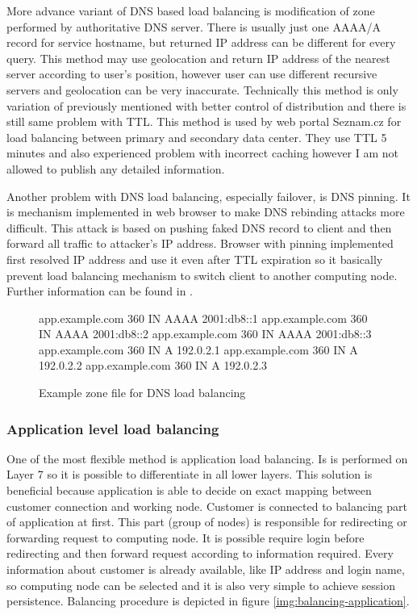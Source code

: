 More advance variant of \Ac{DNS} based load balancing is modification of zone performed by authoritative \Ac{DNS} server. There is usually just one AAAA/A record for service hostname, but returned \Ac{IP} address can be different for every query. This method may use geolocation and return \Ac{IP} address of the nearest server according to user's position, however user can use different recursive servers and geolocation can be very inaccurate. Technically this method is only variation of previously mentioned with better control of distribution and there is still same problem with \Ac{TTL}. This method is used by web portal Seznam.cz for load balancing between primary and secondary data center. They use \Ac{TTL} 5 minutes and also experienced problem with incorrect caching however I am not allowed to publish any detailed information.

Another problem with DNS load balancing, especially failover, is \Ac{DNS} pinning. It is mechanism implemented in web browser to make \Ac{DNS} rebinding attacks more difficult. This attack is based on pushing faked \Ac{DNS} record to client and then forward all traffic to attacker's \Ac{IP} address. Browser with pinning implemented  first resolved \Ac{IP} address and use it even after \Ac{TTL} expiration so it basically prevent load balancing mechanism to switch client to another computing node. Further information can be found in \cite{dns-pinning}.

\begin{figure}[htb]
\caption{Example zone file for DNS load balancing}
\label{code:zone}
\begin{verbatimtab}
app.example.com	360	IN	AAAA	2001:db8::1
app.example.com	360	IN	AAAA	2001:db8::2
app.example.com	360	IN	AAAA	2001:db8::3
app.example.com	360	IN	A	192.0.2.1
app.example.com	360	IN	A	192.0.2.2
app.example.com	360	IN	A	192.0.2.3
\end{verbatimtab}
\end{figure}

\subsubsection{Application level load balancing}
One of the most flexible method is application load balancing. Is is performed on Layer 7 so it is possible to differentiate in all lower layers. This solution is beneficial because application is able to decide on exact mapping between customer connection and working node. 
Customer is connected to balancing part of application at first. This part (group of nodes) is responsible for redirecting or forwarding request to computing node. It is possible require login before redirecting and then forward request according to information required. Every information about customer is already available, like \Ac{IP} address and login name, so computing node can be selected and it is also very simple to achieve session persistence. Balancing procedure is depicted in figure \ref{img:balancing-application}.


